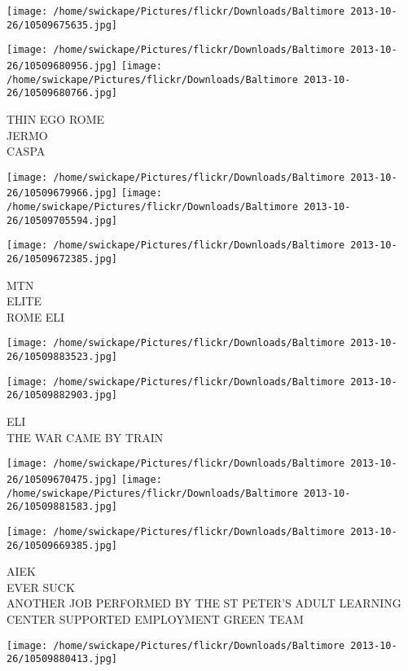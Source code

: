 \documentclass[10pt,letterpaper]{article}
\begin{document}
\texttt{[image: /home/swickape/Pictures/flickr/Downloads/Baltimore 2013-10-26/10509675635.jpg]}

\vspace{0.25in}
\texttt{[image: /home/swickape/Pictures/flickr/Downloads/Baltimore 2013-10-26/10509680956.jpg]}
\texttt{[image: /home/swickape/Pictures/flickr/Downloads/Baltimore 2013-10-26/10509680766.jpg]}

THIN EGO ROME\\
JERMO\\
CASPA\\
\pagebreak

\texttt{[image: /home/swickape/Pictures/flickr/Downloads/Baltimore 2013-10-26/10509679966.jpg]}
\texttt{[image: /home/swickape/Pictures/flickr/Downloads/Baltimore 2013-10-26/10509705594.jpg]}

\texttt{[image: /home/swickape/Pictures/flickr/Downloads/Baltimore 2013-10-26/10509672385.jpg]}

MTN\\
ELITE\\
ROME ELI\\
\pagebreak

\texttt{[image: /home/swickape/Pictures/flickr/Downloads/Baltimore 2013-10-26/10509883523.jpg]}

\vspace{0.25in}
\texttt{[image: /home/swickape/Pictures/flickr/Downloads/Baltimore 2013-10-26/10509882903.jpg]}

ELI\\
THE WAR CAME BY TRAIN\\
\pagebreak

\texttt{[image: /home/swickape/Pictures/flickr/Downloads/Baltimore 2013-10-26/10509670475.jpg]}
\texttt{[image: /home/swickape/Pictures/flickr/Downloads/Baltimore 2013-10-26/10509881583.jpg]}

\texttt{[image: /home/swickape/Pictures/flickr/Downloads/Baltimore 2013-10-26/10509669385.jpg]}

AIEK\\
EVER SUCK\\
ANOTHER JOB PERFORMED BY THE ST PETER'S ADULT LEARNING CENTER SUPPORTED EMPLOYMENT GREEN TEAM\\
\pagebreak

\texttt{[image: /home/swickape/Pictures/flickr/Downloads/Baltimore 2013-10-26/10509880413.jpg]}
\end{document}

